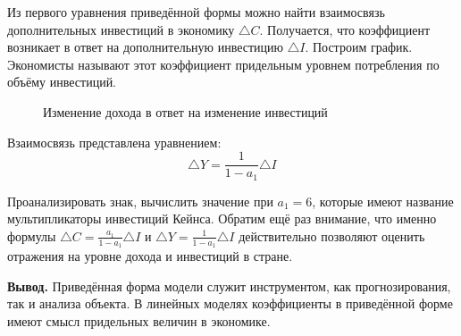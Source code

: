 \documentclass[12pt,a4paper]{article}
\begin{document}
Из первого уравнения приведённой формы можно найти взаимосвязь дополнительных инвестиций в экономику $\triangle C$. Получается, что коэффициент возникает в ответ на дополнительную инвестицию $\triangle I$. Построим график. Экономисты называют этот коэффициент придельным уровнем потребления по объёму инвестиций.

\begin{figure}[H]
\begin{center}
\caption{Изменение дохода в ответ на изменение инвестиций}
\end{center}
\end{figure}

Взаимосвязь представлена уравнением:
\begin{equation}
\triangle Y = \displaystyle{\frac{1}{1-a_1} \triangle I}
\end{equation}

Проанализировать знак, вычислить значение при $a_1 = 6$, которые имеют название мультипликаторы инвестиций Кейнса. Обратим ещё раз внимание, что именно формулы $\triangle C = \displaystyle{\frac{a_1}{1-a_1} \triangle I}$ и $\triangle Y = \displaystyle{\frac{1}{1-a_1} \triangle I}$ действительно позволяют оценить отражения на уровне дохода и инвестиций в стране.

\textbf{Вывод.} Приведённая форма модели служит инструментом, как прогнозирования, так и анализа объекта. В линейных моделях коэффициенты в приведённой форме имеют смысл придельных величин в экономике.
\end{document}
